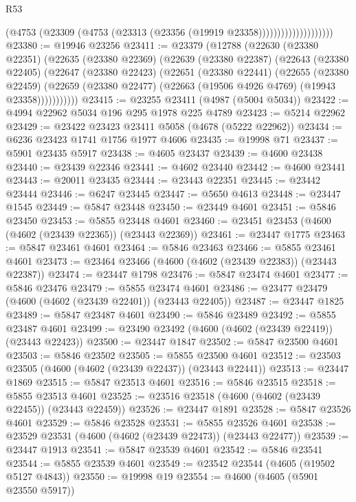 \begin{lexlean}{R53}
\begin{coremodule}
                                (@4753
                                  (@23309 (@4753 (@23313 (@23356 (@19919 @23358))))))))))))))))))))
@23380 := @19946 @23256
@23411 := @23379
    (@12788
      (@22630
        (@23380 @22351)
        (@22635
          (@23380 @22369)
          (@22639
            (@23380 @22387)
            (@22643
              (@23380 @22405)
              (@22647
                (@23380 @22423)
                (@22651
                  (@23380 @22441)
                  (@22655
                    (@23380 @22459)
                    (@22659 (@23380 @22477) (@22663 (@19506 @4926 @4769) (@19943 @23358)))))))))))
@23415 := @23255 @23411 (@4987 (@5004 @5034))
@23422 := @4994 @22962 @5034 @196 @295 @1978 @225 @4789
@23423 := @5214 @22962
@23429 := @23422 @23423 @23411 @5058 (@4678 (@5222 @22962))
@23434 := @6236 @23423 @1741 @1756 @1977 @4606
@23435 := @19998 @71
@23437 := @5901 @23435 @5917
@23438 := @4605 @23437
@23439 := @4600 @23438
@23440 := @23439 @22346
@23441 := @4602 @23440
@23442 := @4600 @23441
@23443 := @20011 @23435
@23444 := @23443 @22351
@23445 := @23442 @23444
@23446 := @6247 @23445
@23447 := @5650 @4613
@23448 := @23447 @1545
@23449 := @5847 @23448
@23450 := @23449 @4601
@23451 := @5846 @23450
@23453 := @5855 @23448 @4601
@23460 := @23451 @23453 (@4600 (@4602 (@23439 @22365)) (@23443 @22369))
@23461 := @23447 @1775
@23463 := @5847 @23461 @4601
@23464 := @5846 @23463
@23466 := @5855 @23461 @4601
@23473 := @23464 @23466 (@4600 (@4602 (@23439 @22383)) (@23443 @22387))
@23474 := @23447 @1798
@23476 := @5847 @23474 @4601
@23477 := @5846 @23476
@23479 := @5855 @23474 @4601
@23486 := @23477 @23479 (@4600 (@4602 (@23439 @22401)) (@23443 @22405))
@23487 := @23447 @1825
@23489 := @5847 @23487 @4601
@23490 := @5846 @23489
@23492 := @5855 @23487 @4601
@23499 := @23490 @23492 (@4600 (@4602 (@23439 @22419)) (@23443 @22423))
@23500 := @23447 @1847
@23502 := @5847 @23500 @4601
@23503 := @5846 @23502
@23505 := @5855 @23500 @4601
@23512 := @23503 @23505 (@4600 (@4602 (@23439 @22437)) (@23443 @22441))
@23513 := @23447 @1869
@23515 := @5847 @23513 @4601
@23516 := @5846 @23515
@23518 := @5855 @23513 @4601
@23525 := @23516 @23518 (@4600 (@4602 (@23439 @22455)) (@23443 @22459))
@23526 := @23447 @1891
@23528 := @5847 @23526 @4601
@23529 := @5846 @23528
@23531 := @5855 @23526 @4601
@23538 := @23529 @23531 (@4600 (@4602 (@23439 @22473)) (@23443 @22477))
@23539 := @23447 @1913
@23541 := @5847 @23539 @4601
@23542 := @5846 @23541
@23544 := @5855 @23539 @4601
@23549 := @23542 @23544 (@4605 (@19502 @5127 @4843))
@23550 := @19998 @19
@23554 := @4600 (@4605 (@5901 @23550 @5917))

\end{coremodule}
\end{lexlean}

